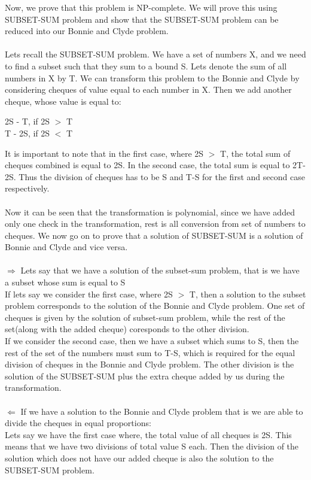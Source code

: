 \documentclass[10pt]{article}
\begin{document}
Now, we prove that this problem is NP-complete. We will prove this using SUBSET-SUM problem and show that the SUBSET-SUM problem can be reduced into our Bonnie and Clyde problem.\\\\
Lets recall the SUBSET-SUM problem. We have a set of numbers X, and we need to find a subset such that they sum to a bound S. Lets denote the sum of all numbers in X by T. We can transform this problem to the Bonnie and Clyde by considering cheques of value equal to each number in X. Then we add another cheque, whose value is equal to:
\begin{center}
2S - T, if 2S $>$ T\\
T - 2S, if 2S $<$ T
\end{center}
It is important to note that in the first case, where 2S $>$ T, the total sum of cheques combined is equal to 2S. In the second case, the total sum is equal to 2T-2S. Thus the division of cheques has to be S and T-S for the first and second case respectively.\\\\
Now it can be seen that the transformation is polynomial, since we have added only one check in the transformation, rest is all conversion from set of numbers to cheques. We now go on to prove that a solution of SUBSET-SUM is a solution of Bonnie and Clyde and vice versa.\\\\
$\Rightarrow$ Lets say that we have a solution of the subset-sum problem, that is we have a subset whose sum is equal to S\\
If lets say we consider the first case, where 2S $>$ T, then a solution to the subset problem corresponds to the solution of the Bonnie and Clyde problem. One set of cheques is given by the solution of subset-sum problem, while the rest of the set(along with the added cheque) coresponds to the other division.\\
If we consider the second case, then we have a subset which sums to S, then the rest of the set of the numbers must sum to T-S, which is required for the equal division of cheques in the Bonnie and Clyde problem. The other division is the solution of the SUBSET-SUM plus the extra cheque added by us during the transformation.\\\\
$\Leftarrow$ If we have a solution to the Bonnie and Clyde problem that is we are able to divide the cheques in equal proportions:\\
Lets say we have the first case where, the total value of all cheques is 2S. This means that we have two divisions of total value S each. Then the division of the solution which does not have our added cheque is also the solution to the SUBSET-SUM problem.\\
\end{document}
